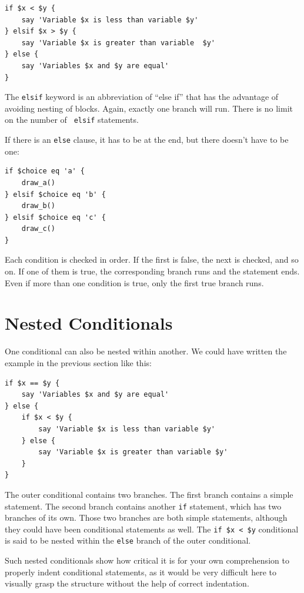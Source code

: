 \begin{verbatim}
if $x < $y {
    say 'Variable $x is less than variable $y'
} elsif $x > $y {
    say 'Variable $x is greater than variable  $y' 
} else {
    say 'Variables $x and $y are equal'
}
\end{verbatim}
%
The {\tt elsif} keyword is an abbreviation of ``else if'' that 
has the advantage of avoiding nesting of blocks. Again, exactly one
branch will run.  There is no limit on the number of {\tt
elsif} statements.  

If there is an {\tt else} clause, it has to be
at the end, but there doesn't have to be one:

\begin{verbatim}
if $choice eq 'a' {
    draw_a()
} elsif $choice eq 'b' {
    draw_b()
} elsif $choice eq 'c' {
    draw_c()
}
\end{verbatim}
%
Each condition is checked in order.  If the first is false,
the next is checked, and so on.  If one of them is
true, the corresponding branch runs and the statement
ends.  Even if more than one condition is true, only the
first true branch runs.


\section{Nested Conditionals}

One conditional can also be nested within another.  We could have
written the example in the previous section like this:

\begin{verbatim}
if $x == $y {
    say 'Variables $x and $y are equal'
} else {
    if $x < $y {
        say 'Variable $x is less than variable $y'
    } else {
        say 'Variable $x is greater than variable $y'
    }
}
\end{verbatim}
%
The outer conditional contains two branches.  The
first branch contains a simple statement.  The second branch
contains another {\tt if} statement, which has two branches of its
own.  Those two branches are both simple statements,
although they could have been conditional statements as well. 
The \verb'if $x < $y' conditional is said to be nested within 
the {\tt else} branch of the outer conditional.

Such nested conditionals show how critical it is for your 
own comprehension to properly indent conditional statements, 
as it would be very difficult here to visually grasp the 
structure without the help of correct indentation.

